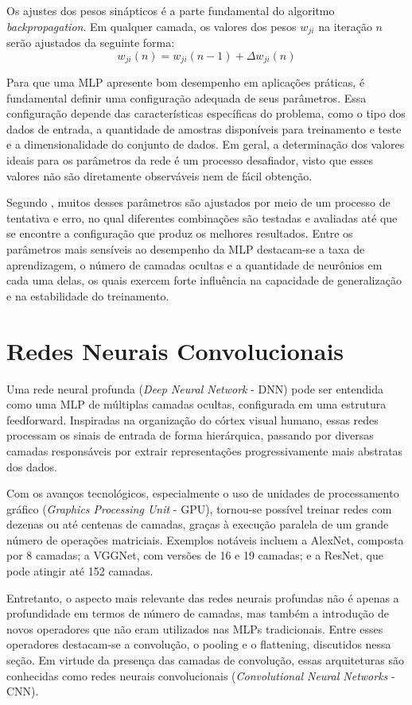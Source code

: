 Os ajustes dos pesos sinápticos é a parte fundamental do algoritmo \textit{backpropagation}. Em qualquer camada, os valores dos pesos $w_{ji}$ na iteração $n$ serão ajustados da seguinte forma:
\begin{equation}
w_{ji}(n)= w_{ji}(n-1) + \Delta w_{ji}(n)
\end{equation}

Para que uma MLP apresente bom desempenho em aplicações práticas, é fundamental definir uma configuração adequada de seus parâmetros. Essa configuração depende das características específicas do problema, como o tipo dos dados de entrada, a quantidade de amostras disponíveis para treinamento e teste e a dimensionalidade do conjunto de dados. Em geral, a determinação dos valores ideais para os parâmetros da rede é um processo desafiador, visto que esses valores não são diretamente observáveis nem de fácil obtenção.

Segundo \cite{36}, muitos desses parâmetros são ajustados por meio de um processo de tentativa e erro, no qual diferentes combinações são testadas e avaliadas até que se encontre a configuração que produz os melhores resultados. Entre os parâmetros mais sensíveis ao desempenho da MLP destacam-se a taxa de aprendizagem, o número de camadas ocultas e a quantidade de neurônios em cada uma delas, os quais exercem forte influência na capacidade de generalização e na estabilidade do treinamento.

\section{Redes Neurais Convolucionais}

Uma rede neural profunda (\textit{Deep Neural Network} - DNN) pode ser entendida como uma MLP de múltiplas camadas ocultas, configurada em uma estrutura feedforward. Inspiradas na organização do córtex visual humano, essas redes processam os sinais de entrada de forma hierárquica, passando por diversas camadas responsáveis por extrair representações progressivamente mais abstratas dos dados.

Com os avanços tecnológicos, especialmente o uso de unidades de processamento gráfico (\textit{Graphics Processing Unit} - GPU), tornou-se possível treinar redes com dezenas ou até centenas de camadas, graças à execução paralela de um grande número de operações matriciais. Exemplos notáveis incluem a AlexNet, composta por 8 camadas; a VGGNet, com versões de 16 e 19 camadas; e a ResNet, que pode atingir até 152 camadas.

Entretanto, o aspecto mais relevante das redes neurais profundas não é apenas a profundidade em termos de número de camadas, mas também a introdução de novos operadores que não eram utilizados nas MLPs tradicionais. Entre esses operadores destacam-se a convolução, o pooling e o flattening, discutidos nessa seção. Em virtude da presença das camadas de convolução, essas arquiteturas são conhecidas como redes neurais convolucionais (\textit{Convolutional Neural Networks} - CNN).
